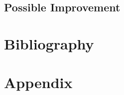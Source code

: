 \documentclass[11pt,a4paper]{article}
\begin{document}
    \subsection{Possible Improvement}

    \newpage
    \section{Bibliography}
    \nocite{simple_xgb, detailed_eda}
    
    

    \newpage
    \section{Appendix}
\end{document}
